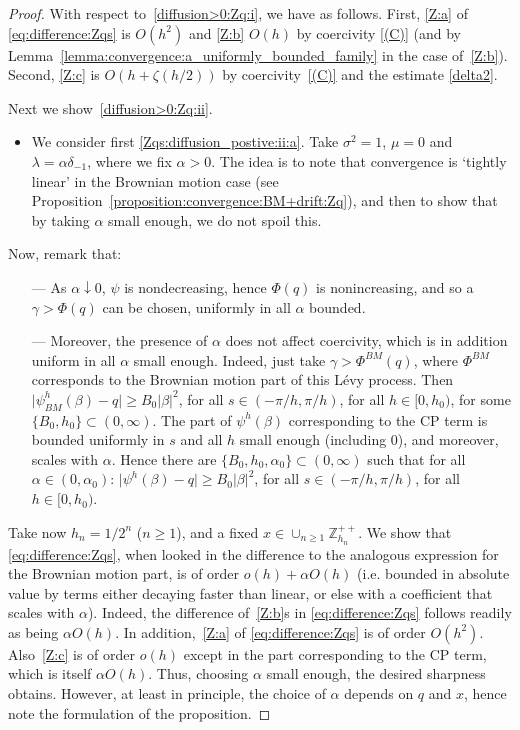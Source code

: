 \documentclass[pdftex,oneside,11pt,reqno]{amsart}
\theoremstyle{definition}
\theoremstyle{theorem}
\theoremstyle{remark}
\numberwithin{equation}{section}
\numberwithin{definition}{section}
\begin{document}
\begin{proof}
With respect to~\ref{diffusion>0:Zq:i}, we have as follows. First, \ref{Z:a} of \eqref{eq:difference:Zqs} is $O(h^2)$ and \ref{Z:b} $O(h)$ by coercivity \ref{(C)} (and by Lemma~\ref{lemma:convergence:a_uniformly_bounded_family} in the case of~\ref{Z:b}). Second, \ref{Z:c} is $O(h+\zeta(h/2))$ by coercivity~\ref{(C)} and the estimate \ref{delta2}. 

Next we show~\ref{diffusion>0:Zq:ii}. 
\begin{itemize}
\item We consider first \ref{Zqs:diffusion_postive:ii:a}. Take ${\sigma^2}=1$, ${\mu}=0$ and ${\lambda}=\alpha \delta_{-1}$, where we fix $\alpha>0$. The idea is to note that convergence is `tightly linear' in the Brownian motion case (see Proposition~\ref{proposition:convergence:BM+drift:Zq}), and then to show that by taking $\alpha$ small enough, we do not spoil this.
\end{itemize}
Now, remark that:
\begin{itemize}
\item[---] As $\alpha\downarrow 0$, $\psi$ is nondecreasing, hence $\Phi(q)$ is nonincreasing, and so a $\gamma>\Phi(q)$ can be chosen, uniformly in all $\alpha$ bounded.
\item[---] Moreover, the presence of $\alpha$ does not affect coercivity, which is in addition uniform in all $\alpha$ small enough. Indeed, just take $\gamma>\Phi^{BM}(q)$, where $\Phi^{BM}$ corresponds to the Brownian motion part of this L\'evy process. Then $\vert \psi^h_{BM}(\beta)-q\vert\geq B_0\vert \beta\vert^2$, for all $s\in (-\pi/h,\pi/h)$, for all $h\in [0,h_0)$, for some $\{B_0,h_0\}\subset (0,\infty)$. The part of $\psi^h(\beta)$ corresponding to the CP term is bounded uniformly in $s$ and all $h$ small enough (including $0$), and moreover, scales with $\alpha$. Hence there are $\{B_0, h_0,\alpha_0\}\subset (0,\infty)$ such that for all $\alpha\in (0,\alpha_0)$: $\vert \psi^h(\beta)-q\vert\geq B_0\vert \beta\vert^2$, for all $s\in (-\pi/h,\pi/h)$, for all $h\in [0,h_0)$. 
\end{itemize}
Take now $h_n=1/2^n$ ($n\geq 1$), and a fixed $x\in \cup_{n\geq 1}\mathbb{Z}_{h_n}^{++}$. We show that \eqref{eq:difference:Zqs}, when looked in the difference to the analogous expression for the Brownian motion part, is of order $o(h)+\alpha O(h)$ (i.e. bounded in absolute value by terms either decaying faster than linear, or else with a coefficient that scales with $\alpha$). Indeed, the difference of~\ref{Z:b}s in \eqref{eq:difference:Zqs} follows readily as being $\alpha O(h)$. In addition,~\ref{Z:a} of \eqref{eq:difference:Zqs} is of order $O(h^2)$. Also~\ref{Z:c} is of order $o(h)$ except in the part corresponding to the CP term, which is itself $\alpha O(h)$. Thus, choosing $\alpha$ small enough, the desired sharpness obtains. However, at least in principle, the choice of $\alpha$ depends on $q$ and $x$, hence note the formulation of the proposition.

\end{proof}
\end{document}
